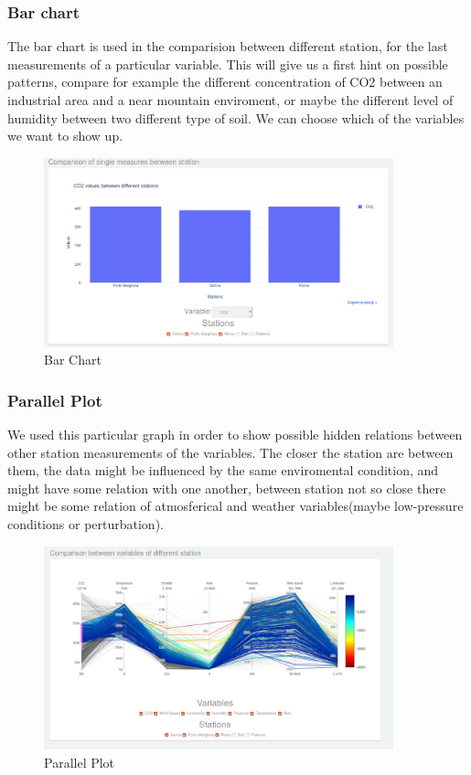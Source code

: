 \documentclass[12pt]{article} %
\begin{document}
\subsubsection{Bar chart}
The bar chart is used in the comparision between different station, for the last measurements of a particular variable.
This will give us a first hint on possible patterns, compare for example the different concentration of CO2 between an industrial area and a near mountain enviroment, or maybe the different level of humidity between two different type of soil.
We can choose which of the variables we want to show up.
\begin{figure}[H]
  \centering
  \includegraphics[width=0.9\textwidth]{img/BarChart.png}
  \caption{Bar Chart}
  \label{fig:scttrPlot}
\end{figure} 

\newpage

\subsubsection{Parallel Plot}
We used this particular graph in order to show possible hidden relations between other station measurements of the variables.
The closer the station are between them, the data might be influenced by the same enviromental condition, and might have some relation with one another, between station not so close there might be some relation of atmosferical and weather variables(maybe low-pressure conditions or perturbation).
\begin{figure}[H]
  \centering
  \includegraphics[width=0.9\textwidth]{img/ParallelPlot.png}
  \caption{Parallel Plot}
  \label{fig:scttrPlot}
\end{figure}
\end{document}

